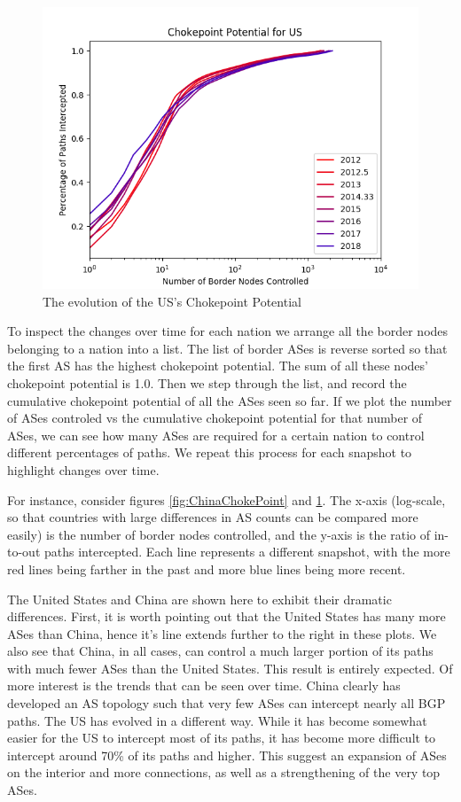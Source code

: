 \documentclass[10pt, conference, letterpaper]{IEEEtran}
\begin{document}
\begin{figure}
	\centering
	\includegraphics[width=\linewidth]{single_US}
	\caption{The evolution of the US's Chokepoint Potential}\label{fig:USChokePoint}
\end{figure}

To inspect the changes over time for each nation we arrange all the border nodes belonging to a nation into a list. The list of border ASes is reverse sorted
so that the first AS has the highest chokepoint potential. The sum of all these nodes' chokepoint potential is 1.0. Then we step through the list, and record
the cumulative chokepoint potential of all the ASes seen so far. If we plot the number of ASes controled vs the cumulative chokepoint potential for that number
of ASes, we can see how many ASes are required for a certain nation to control different percentages of paths. We repeat this process for each snapshot to highlight
changes over time.

\par
For instance, consider figures \ref{fig:ChinaChokePoint} and \ref{fig:USChokePoint}. 
The x-axis (log-scale, so that countries with large differences in AS counts can be compared more easily)
is the number of border nodes controlled, and the y-axis is the ratio of in-to-out paths intercepted. Each line represents a different snapshot, with the more red lines being
farther in the past and more blue lines being more recent.

\par
The United States and China are shown here to exhibit their dramatic differences. First, it is worth pointing out that the United States has many more ASes than China, hence
it's line extends further to the right in these plots. We also see that China, in all cases, can control a much larger portion of its paths with much fewer ASes than the
United States. This result is entirely expected. Of more interest is the trends that can be seen over time. China clearly has developed an AS topology such that very few
ASes can intercept nearly all BGP paths. The US has evolved in a different way. While it has become somewhat easier for the US to intercept most of its paths, it has become
more difficult to intercept around 70\% of its paths and higher. This suggest an expansion of ASes on the interior and more connections, as well as a strengthening of
the very top ASes.
\end{document}
